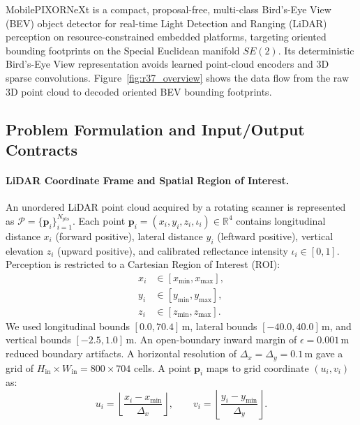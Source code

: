 
MobilePIXORNeXt is a compact, proposal-free, multi-class Bird's-Eye View (BEV) object detector for real-time Light Detection and Ranging (LiDAR) perception on resource-constrained embedded platforms, targeting oriented bounding footprints on the Special Euclidean manifold $SE(2)$. Its deterministic Bird's-Eye View representation avoids learned point-cloud encoders and 3D sparse convolutions. Figure~\ref{fig:r37_overview} shows the data flow from the raw 3D point cloud to decoded oriented BEV bounding footprints.

\par\vspace{-0.5\baselineskip}
\subsection{Problem Formulation and Input/Output Contracts}
\label{sec:problem_formulation}

\paragraph{LiDAR Coordinate Frame and Spatial Region of Interest.}
An unordered LiDAR point cloud acquired by a rotating scanner is represented as $\mathcal{P} = \{\mathbf{p}_i\}_{i=1}^{N_{\mathrm{pts}}}$. Each point $\mathbf{p}_i = (x_i, y_i, z_i, \iota_i) \in \mathbb{R}^4$ contains longitudinal distance $x_i$ (forward positive), lateral distance $y_i$ (leftward positive), vertical elevation $z_i$ (upward positive), and calibrated reflectance intensity $\iota_i \in [0, 1]$. Perception is restricted to a Cartesian Region of Interest (ROI):
\begin{equation}
    \begin{aligned}
        x_i &\in [x_{\min}, x_{\max}], \\
        y_i &\in [y_{\min}, y_{\max}], \\  z_i &\in [z_{\min}, z_{\max}].
    \end{aligned}
    \label{eq:spatial_roi}
\end{equation}
We used longitudinal bounds $[0.0, 70.4]$\,m, lateral bounds $[-40.0, 40.0]$\,m, and vertical bounds $[-2.5, 1.0]$\,m. An open-boundary inward margin of $\epsilon = 0.001$\,m reduced boundary artifacts. A horizontal resolution of $\Delta_x = \Delta_y = 0.1$\,m gave a grid of $H_{\mathrm{in}} \times W_{\mathrm{in}} = 800 \times 704$ cells. A point $\mathbf{p}_i$ maps to grid coordinate $(u_i, v_i)$ as:
\begin{equation}
    u_i = \left\lfloor \frac{x_i - x_{\min}}{\Delta_x} \right\rfloor, \qquad v_i = \left\lfloor \frac{y_i - y_{\min}}{\Delta_y} \right\rfloor.
    \label{eq:grid_assignment}
\end{equation}

